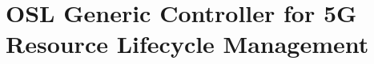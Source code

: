 \section{\acs{OSL}\hspace{-0.1em} Generic Controller for \acs{5G} Resource Lifecycle Management}
\label{chap:impl:gcontroller}
